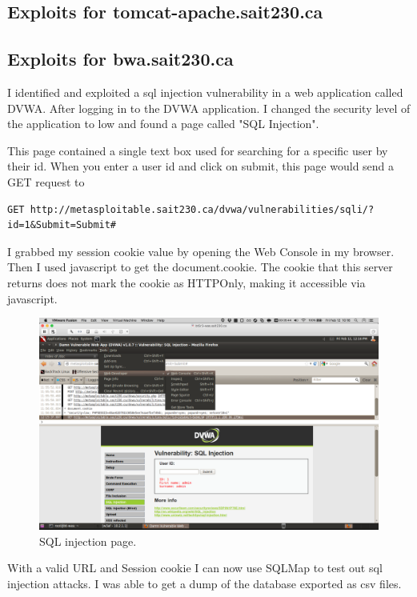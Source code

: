\documentclass{article}
\begin{document}
\newpage
\subsection{Exploits for tomcat-apache.sait230.ca}


\newpage
\subsection{Exploits for bwa.sait230.ca}

I identified and exploited a sql injection vulnerability in a web application called DVWA\@.
After logging in to the DVWA application. I changed the security level of the application to low
and found a page called "SQL Injection".

This page contained a single text box used for searching for a specific user by their id.
When you enter a user id and click on submit, this page would send a GET request to 

\begin{lstlisting}
GET http://metasploitable.sait230.ca/dvwa/vulnerabilities/sqli/?id=1&Submit=Submit#
\end{lstlisting}

I grabbed my session cookie value by opening the Web Console in my browser. 
Then I used javascript to get the document.cookie. The cookie that this server
returns does not mark the cookie as HTTPOnly, making it accessible via javascript.

\begin{figure}[h!]
	\includegraphics[width=\linewidth]{images/dvwa-sql-injection.png}
	\caption{SQL injection page.}
	\label{fig:sql-injection}
\end{figure}

\newpage
With a valid URL and Session cookie I can now use SQLMap to test out sql injection attacks.
I was able to get a dump of the database exported as csv files.
\end{document}
